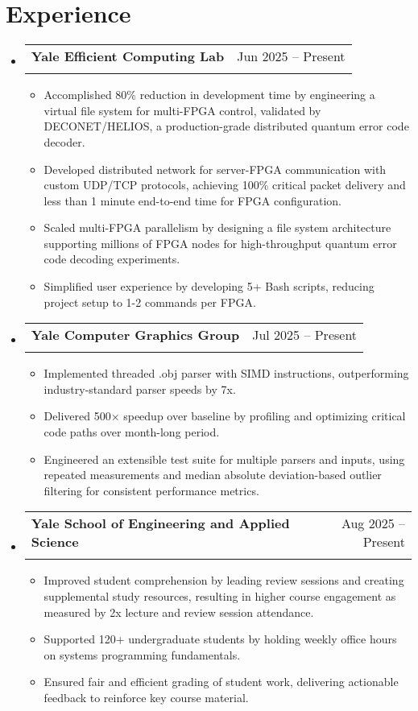 \documentclass[letterpaper,11pt]{article}
\makeatletter
\newcommand{\resumeItem}[1]{
  \item\small{
    {#1 \vspace{-2pt}}
  }
}
\newcommand{\resumeSubheading}[4]{
  \vspace{-2pt}\item
    \begin{tabular*}{0.97\textwidth}[t]{l@{\extracolsep{\fill}}r}
      \textbf{#1} & #2 \\
      \text{\small#3} & \text{\small #4} \\
    \end{tabular*}\vspace{-7pt}
}
\newcommand{\resumeSubHeadingListStart}{\begin{itemize}[leftmargin=0.15in, label={}]}
\newcommand{\resumeSubHeadingListEnd}{\end{itemize}}
\newcommand{\resumeItemListStart}{\begin{itemize}}
\newcommand{\resumeItemListEnd}{\end{itemize}\vspace{-5pt}}
\makeatother
\begin{document}
\section{Experience}
  \resumeSubHeadingListStart
    \resumeSubheading
      {Yale Efficient Computing Lab}{Jun 2025 -- Present}
      {Research Assistant (advised by Prof. Lin Zhong)}{New Haven, CT}
      \resumeItemListStart
        \resumeItem{Accomplished 80\% reduction in development time by engineering a virtual file system for multi-FPGA control, validated by DECONET/HELIOS, a production-grade distributed quantum error code decoder.}
        \resumeItem{Developed distributed network for server-FPGA communication with custom UDP/TCP protocols, achieving 100\% critical packet delivery and less than 1 minute end-to-end time for FPGA configuration.}
        \resumeItem{Scaled multi-FPGA parallelism by designing a file system architecture supporting millions of FPGA nodes for high-throughput quantum error code decoding experiments.}
        \resumeItem{Simplified user experience by developing 5+ Bash scripts, reducing project setup to 1-2 commands per FPGA.}
      \resumeItemListEnd
    \resumeSubheading
      {Yale Computer Graphics Group}{Jul 2025 -- Present}
      {Researcher (advised by Prof. Mike Shah)}{Part-time, New Haven, CT}
      \resumeItemListStart
        \resumeItem{Implemented threaded .obj parser with SIMD instructions, outperforming industry-standard parser speeds by 7x.}
        \resumeItem{Delivered 500× speedup over baseline by profiling and optimizing critical code paths over month-long period.}
        \resumeItem{Engineered an extensible test suite for multiple parsers and inputs, using repeated measurements and median absolute deviation-based outlier filtering for consistent performance metrics.}
      \resumeItemListEnd
    \resumeSubheading
      {Yale School of Engineering and Applied Science}{Aug 2025 -- Present}
      {Teaching Assistant (Computer Systems)}{Part-time, New Haven, CT}
      \resumeItemListStart
        \resumeItem{Improved student comprehension by leading review sessions and creating supplemental study resources, resulting in higher course engagement as measured by 2x lecture and review session attendance.}
        \resumeItem{Supported 120+ undergraduate students by holding weekly office hours on systems programming fundamentals.}
        \resumeItem{Ensured fair and efficient grading of student work, delivering actionable feedback to reinforce key course material.}
      \resumeItemListEnd
  \resumeSubHeadingListEnd
\end{document}

